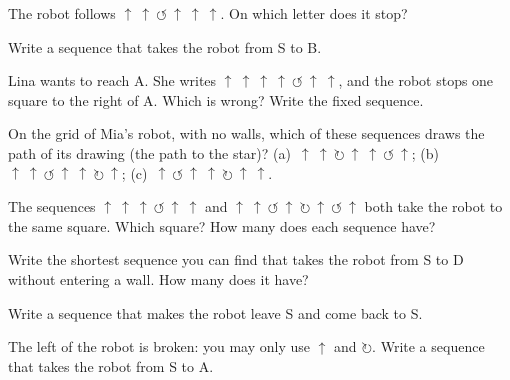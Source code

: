 \begin{exercise}[$\star$]\label{exo:g1:instructions-in-order:3}
The robot follows
$\uparrow\ \uparrow\ \circlearrowleft\ \uparrow\ \uparrow\ \uparrow$.
On which letter does it stop?
\end{exercise}

\begin{exercise}[$\star$]\label{exo:g1:instructions-in-order:4}
Write a sequence that takes the robot from S to B.
\end{exercise}

\begin{exercise}[$\star$]\label{exo:g1:instructions-in-order:5}
Lina wants to reach A. She writes
$\uparrow\ \uparrow\ \uparrow\ \uparrow\ \circlearrowleft\ \uparrow\ \uparrow$,
and the robot stops one square to the right of A. Which  is wrong?
Write the fixed sequence.
\end{exercise}

\begin{exercise}[$\star$]\label{exo:g1:instructions-in-order:6}
On the grid of Mia's robot, with no walls, which of these sequences draws
the path of its drawing (the path to the star)?
(a)~$\uparrow\ \uparrow\ \circlearrowright\ \uparrow\ \uparrow\ \circlearrowleft\ \uparrow$;
(b)~$\uparrow\ \uparrow\ \circlearrowleft\ \uparrow\ \uparrow\ \circlearrowright\ \uparrow$;
(c)~$\uparrow\ \circlearrowleft\ \uparrow\ \uparrow\ \circlearrowright\ \uparrow\ \uparrow$.
\end{exercise}

\begin{exercise}[$\star$]\label{exo:g1:instructions-in-order:7}
The sequences $\uparrow\ \uparrow\ \uparrow\ \circlearrowleft\ \uparrow\ \uparrow$
and $\uparrow\ \uparrow\ \circlearrowleft\ \uparrow\ \circlearrowright\ \uparrow\ \circlearrowleft\ \uparrow$
both take the robot to the same square. Which square? How many 
does each sequence have?
\end{exercise}

\begin{exercise}[$\star\star$]\label{exo:g1:instructions-in-order:8}
Write the shortest sequence you can find that takes the robot from S to D
without entering a wall. How many  does it have?
\end{exercise}

\begin{exercise}[$\star\star$]\label{exo:g1:instructions-in-order:9}
Write a sequence that makes the robot leave S and come back to S.
\end{exercise}

\begin{exercise}[$\star\star$]\label{exo:g1:instructions-in-order:10}
The left  of the robot is broken: you may only use
$\uparrow$ and $\circlearrowright$. Write a sequence that takes the robot from
S to A.
\end{exercise}
